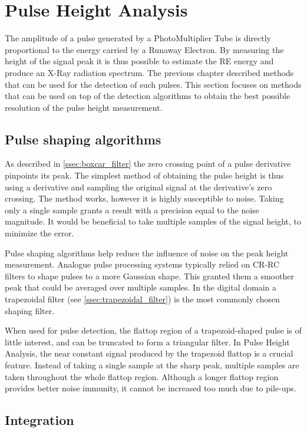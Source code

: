 \section{Pulse Height Analysis}

The amplitude of a pulse generated by a PhotoMultiplier Tube
is directly proportional to the energy carried by a Runaway 
Electron. By measuring the height of the signal peak 
it is thus possible to estimate the RE energy and
produce an X-Ray radiation spectrum. The previous chapter
described methods that can be used for the detection of such pulses.
This section focuses on methods that can be used on top of
the detection algorithms to obtain the best possible resolution 
of the pulse height measurement.

\subsection{Pulse shaping algorithms}
As described in \autoref{ssec:boxcar_filter} the zero crossing point 
of a pulse derivative pinpoints its peak.
The simplest method of obtaining the pulse height
is thus using a derivative and sampling the original signal
at the derivative's zero crossing.
The method works, however it is highly susceptible to noise.
Taking only a single sample grants a result with a precision 
equal to the noise magnitude. It would be beneficial
to take multiple samples of the signal height, to minimize 
the error.


Pulse shaping algorithms help reduce the influence of noise
on the peak height measurement. Analogue pulse processing 
systems typically relied on CR-RC filters to shape 
pulses to a more Gaussian shape. This granted them 
a smoother peak that could be averaged over multiple samples.
In the digital domain a trapezoidal filter 
(see \autoref{ssec:trapezoidal_filter})
is the most commonly chosen shaping filter.


When used for pulse detection, the flattop region of
a trapezoid-shaped pulse is of little interest, and 
can be truncated to form a triangular filter. In Pulse Height
Analysis, the near constant signal produced
by the trapezoid flattop is a crucial feature. 
Instead of taking a single sample at the sharp peak,
multiple samples are taken throughout the whole flattop region.
Although a longer flattop region provides better noise immunity, 
it cannot be increased too much due to pile-ups.

\subsection{Integration}

